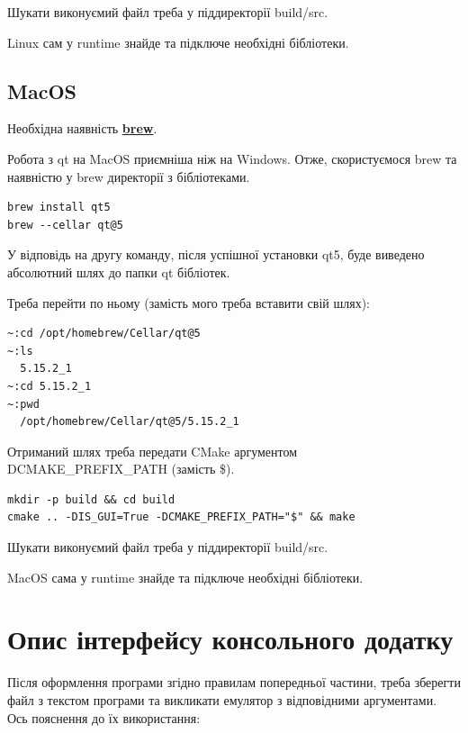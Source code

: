 \documentclass[oneside,final,14pt]{extreport}
\begin{document}
Шукати виконуємий файл треба у піддиректорії build/src.

Linux сам у runtime знайде та підключе необхідні бібліотеки.

\subsection{MacOS}

Необхідна наявність \textbf{\href{https://brew.sh}{brew}}.

Робота з qt на MacOS приємніша ніж на Windows. Отже, скористуємося brew та наявністю у brew директорії з бібліотеками.

\begin{tcolorbox}
\begin{verbatim}
brew install qt5
brew --cellar qt@5
\end{verbatim}
\end{tcolorbox}
У відповідь на другу команду, після успішної установки qt5, буде виведено абсолютний шлях до папки qt бібліотек.

Треба перейти по ньому (замість мого треба вставити свій шлях):

\begin{tcolorbox}
\begin{verbatim}
~:cd /opt/homebrew/Cellar/qt@5
~:ls
  5.15.2_1
~:cd 5.15.2_1
~:pwd
  /opt/homebrew/Cellar/qt@5/5.15.2_1
\end{verbatim}
\end{tcolorbox}

Отриманий шлях треба передати CMake аргументом DCMAKE\_PREFIX\_PATH (замість \$).

\begin{tcolorbox}
\begin{verbatim}
mkdir -p build && cd build
cmake .. -DIS_GUI=True -DCMAKE_PREFIX_PATH="$" && make
\end{verbatim}
\end{tcolorbox}

Шукати виконуємий файл треба у піддиректорії build/src.

MacOS сама у runtime знайде та підключе необхідні бібліотеки.

\section{Опис інтерфейсу консольного додатку}
Після оформлення програми згідно правилам попередньої частини, треба зберегти файл з текстом програми та викликати емулятор з відповідними аргументами. Ось пояснення до їх використання:
\bigskip
		
\end{document}
